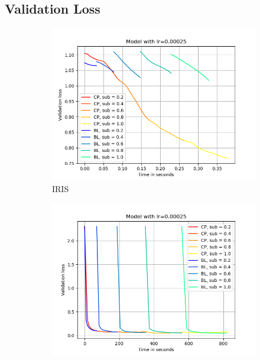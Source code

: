 \subsection{Validation Loss}
\begin{figure}[h]
    \centering
    \begin{subfigure}[b]{0.24\textwidth}
        \centering
        \includegraphics[width=\textwidth]{figures/22_07/iris/loss_time_0.00025.png}
        \caption{IRIS}
        \label{fig:1a}
    \end{subfigure}
    \begin{subfigure}[b]{0.24\textwidth}
        \centering
        \includegraphics[width=\textwidth]{figures/22_07/10ep/loss_time_0.00025.png}

\end{subfigure}
\end{figure}
